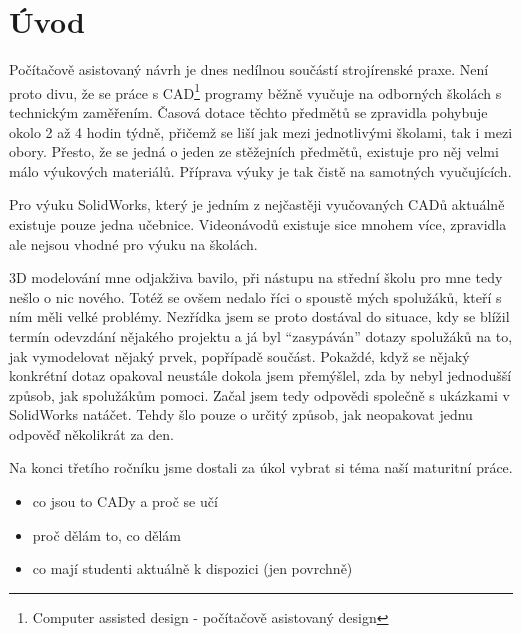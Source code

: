 \chapter*{Úvod}
Počítačově asistovaný návrh je dnes nedílnou součástí strojírenské praxe.
Není proto divu, že se práce s CAD\footnote{Computer assisted design - počítačově asistovaný design} programy běžně vyučuje na odborných školách s technickým zaměřením.
Časová dotace těchto předmětů se zpravidla pohybuje okolo 2 až 4 hodin týdně, přičemž se liší jak mezi jednotlivými školami, tak i mezi obory.
Přesto, že se jedná o jeden ze stěžejních předmětů, existuje pro něj velmi málo výukových materiálů.
Příprava výuky je tak čistě na samotných vyučujících.

Pro výuku SolidWorks, který je jedním z nejčastěji vyučovaných CADů aktuálně existuje pouze jedna učebnice.
Videonávodů existuje sice mnohem více, zpravidla ale nejsou vhodné pro výuku na školách.

3D modelování mne odjakživa bavilo, při nástupu na střední školu pro mne tedy nešlo o nic nového.
Totéž se ovšem nedalo říci o spoustě mých spolužáků, kteří s ním měli velké problémy.
Nezřídka jsem se proto dostával do situace, kdy se blížil termín odevzdání nějakého projektu a já byl \enquote{zasypáván} dotazy spolužáků na to, jak vymodelovat nějaký prvek, popřípadě součást.
Pokaždé, když se nějaký konkrétní dotaz opakoval neustále dokola jsem přemýšlel, zda by nebyl jednodušší způsob, jak spolužákům pomoci.
Začal jsem tedy odpovědi společně s ukázkami v SolidWorks natáčet.
Tehdy šlo pouze o určitý způsob, jak neopakovat jednu odpověď několikrát za den.

Na konci třetího ročníku jsme dostali za úkol vybrat si téma naší maturitní práce.


\vfill
\noindent {}
\begin{itemize}[topsep=0pt]
    \setlength\itemsep{0.05em}
    \item co jsou to CADy a proč se učí
    \item proč dělám to, co dělám
    \item co mají studenti aktuálně k dispozici (jen povrchně)
\end{itemize}

\newpage
